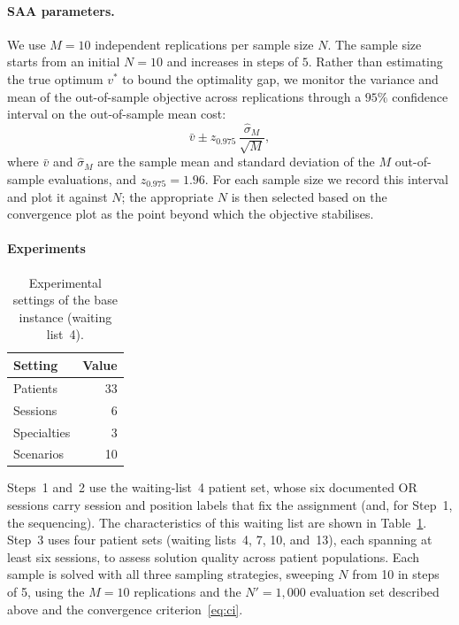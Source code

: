 \paragraph{SAA parameters.}
We use $M = 10$ independent replications per sample size $N$. The sample size starts from an initial $N = 10$ and increases in steps of $5$. Rather than estimating the true
optimum $v^*$ to bound the optimality gap, we monitor the variance and mean of the
out-of-sample objective across replications through a $95\%$ confidence interval
on the out-of-sample mean cost:
%
\begin{equation}
  \bar{v} \pm z_{0.975}\,\frac{\hat{\sigma}_M}{\sqrt{M}},
  \label{eq:ci}
\end{equation}
%
where $\bar{v}$ and $\hat{\sigma}_M$ are the sample mean and standard
deviation of the $M$ out-of-sample evaluations, and $z_{0.975} = 1.96$.
For each sample size we record this interval and plot it against $N$; the
appropriate $N$ is then selected based on the convergence plot as
the point beyond which the objective stabilises.

\paragraph{Experiments}

\begin{table}[H]
  \centering
  \caption{Experimental settings of the base instance (waiting list~4).}
  \label{tab:instance}
  \begin{tabular}{lr}
    \toprule
    Setting & Value \\
    \midrule
    Patients    & 33 \\
    Sessions    & 6  \\
    Specialties & 3  \\
    Scenarios   & 10 \\
    \bottomrule
  \end{tabular}
\end{table}

Steps~1 and~2 use the waiting-list~4 patient set, whose six documented OR
sessions carry session and position labels that fix the assignment (and, for
Step~1, the sequencing). The characteristics of this waiting list are shown in Table~\ref{tab:instance}. Step~3 uses four patient sets (waiting lists~4, 7, 10,
and~13), each spanning at least six sessions, to assess solution quality across
patient populations. Each sample is solved with all three sampling strategies,
sweeping $N$ from 10 in steps of 5, using the $M = 10$ replications and the
$N' = 1{,}000$ evaluation set described above and the convergence
criterion~\eqref{eq:ci}.
